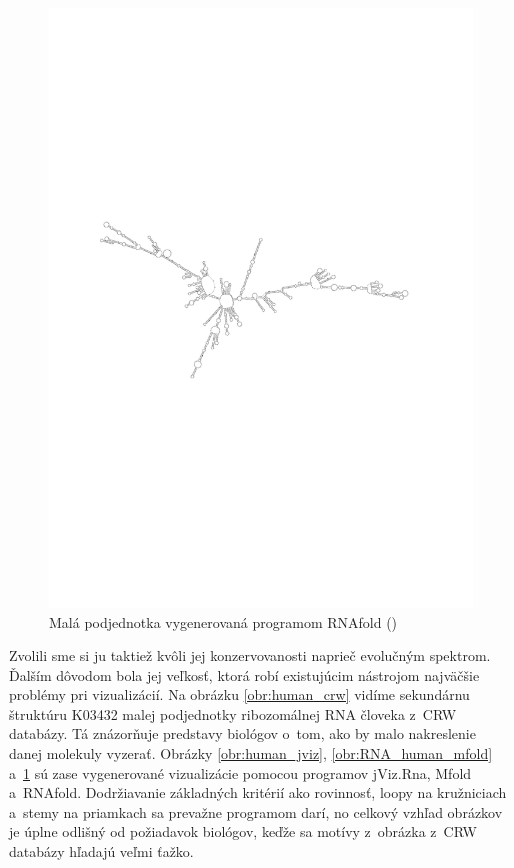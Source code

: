 \begin{figure}
  \centering
  \includegraphics[clip, trim=2.5cm 10cm 3cm 10cm, angle=90, width=1\textwidth]{../img/human_RNAfold}
  \caption{Malá podjednotka vygenerovaná programom RNAfold (\citet{VIENNA_RNA})}
  \label{obr:RNA_human_rnafold}
\end{figure}

Zvolili sme si ju taktiež kvôli jej konzervovanosti naprieč evolučným spektrom. Ďalším
dôvodom bola jej veľkosť, ktorá robí existujúcim nástrojom najväčšie problémy
pri vizualizácií. Na obrázku \ref{obr:human_crw} vidíme sekundárnu štruktúru 
K03432 malej podjednotky ribozomálnej RNA človeka z~CRW databázy.
Tá znázorňuje predstavy biológov o~tom, ako by malo nakreslenie danej molekuly vyzerať.
Obrázky \ref{obr:human_jviz}, \ref{obr:RNA_human_mfold} a~\ref{obr:RNA_human_rnafold}
sú zase vygenerované vizualizácie pomocou programov jViz.Rna, Mfold a~RNAfold.
Dodržiavanie základných kritérií ako rovinnosť, loopy na kružniciach a~stemy na priamkach
sa prevažne programom darí, no celkový vzhľad obrázkov je úplne odlišný od požiadavok
biológov, keďže sa motívy z~obrázka z~CRW databázy hľadajú veľmi ťažko.





